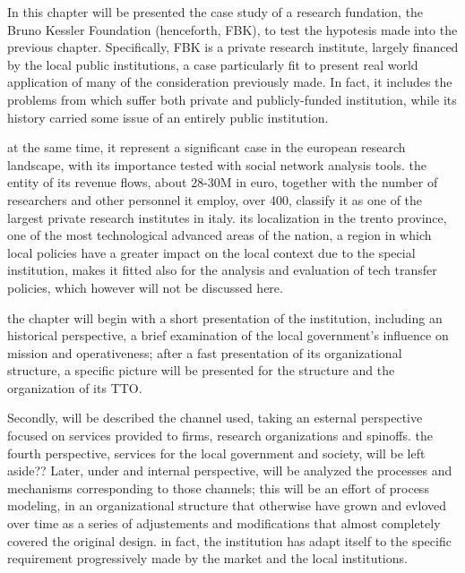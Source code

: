 

\label{Chapter7}

In this chapter will be presented the case study of a research fundation, the Bruno Kessler Foundation (henceforth, FBK), to test the hypotesis made into the previous chapter. Specifically, FBK is a private research institute, largely financed by the local public institutions, a case particularly fit to present real world application of many of the consideration previously made. In fact, it includes the problems from which suffer both private and publicly-funded institution, while its history carried some issue of an entirely public institution. 

at the same time, it represent a significant case in the european research landscape, with its importance tested with social network analysis tools. the entity of its revenue flows, about 28-30M in euro, together with the number of researchers and other personnel it employ, over 400, classify it as one of the largest private research institutes in italy. its localization in the trento province, one of the most technological advanced areas of the nation, a region in which local policies have a greater impact on the local context due to the special institution, makes it fitted also for the analysis and evaluation of tech transfer policies, which however will not be discussed here.

the chapter will begin with a short presentation of the institution, including an historical perspective, a brief examination of the local government's influence on mission and operativeness; after a fast presentation of its organizational structure, a specific picture will be presented for the structure and the organization of its TTO.

Secondly, will be described the channel used, taking an esternal perspective focused on services provided to firms, research organizations and spinoffs. the fourth perspective, services for the local government and society, will be left aside?? Later, under and internal perspective, will be analyzed the processes and mechanisms corresponding to those channels; this will be an effort of process modeling, in an organizational structure that otherwise have grown and evloved over time as a series of adjustements and modifications that almost completely covered the original design. in fact, the institution has adapt itself to the specific requirement progressively made by the market and the local institutions. 

